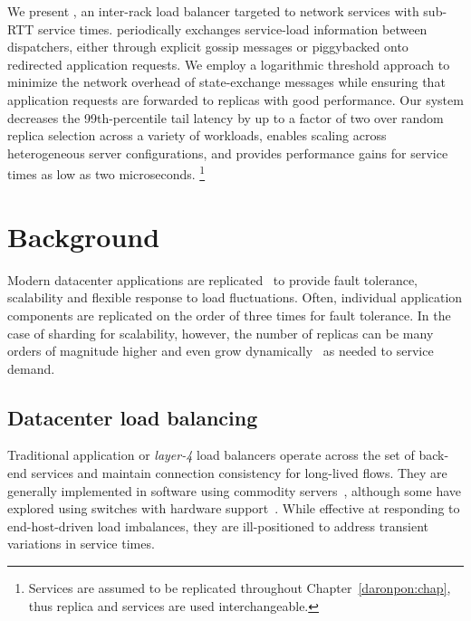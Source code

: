 We present \daronpon, an inter-rack load balancer targeted to network
services with sub-RTT service times.  \daronpon periodically
exchanges service-load information between dispatchers, either through
explicit gossip messages or piggybacked onto redirected application
requests.  We employ a logarithmic threshold approach to minimize
the network overhead of state-exchange messages while ensuring that
application requests are forwarded to replicas with good performance.
Our system decreases the 99th-percentile tail latency by up to a
factor of two over random replica selection across a variety of
workloads, enables scaling across heterogeneous server
configurations, and provides performance gains for service times as
low as two microseconds.
%
\footnote{
Services are assumed to be replicated throughout Chapter~\ref{daronpon:chap}, thus
replica and services are used interchangeable.}


\section{Background}
\label{daronpon:sec:background}


Modern datacenter applications are
replicated~\cite{rocksdb,memcached,mongodb} to provide fault
tolerance, scalability and flexible response to load
fluctuations. Often, individual application components are replicated
on the order of three times for fault tolerance. In the case of
sharding for scalability, however, the number of replicas can be many
orders of magnitude higher and even grow
dynamically~\cite{facebook_shard,google_slicer,microsoft_service_fabric}
as needed to service demand.

\subsection{Datacenter load balancing}
Traditional application or \textit{layer-4} load balancers operate across
the set of back-end services and maintain connection consistency for
long-lived flows. They are generally implemented in software using
commodity servers~\cite{cheetah, maglev, beamer, ananta}, although
some have explored using switches with hardware support~\cite{duet,
  silkroad}.  While effective at responding to end-host-driven load
imbalances, they are ill-positioned to address transient
variations in service times.

